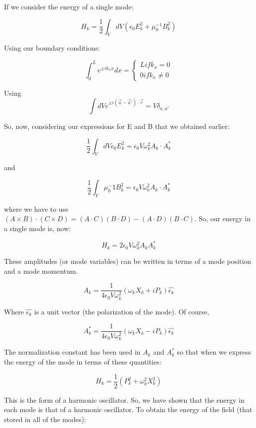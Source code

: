 \documentclass{article}
\begin{document}
If we consider the energy of a single mode:

\[ 
    H_k = \frac{1}{2}\int_{V} dV \left( \epsilon_0 E_k^2 + \mu_0^{-1} B_k^2 \right) 
\]

Using our boundary conditions:

\[ 
    \int_0^L e^{\pm i k_x x} dx  = 
    \begin{cases} 
        L if k_x = 0 \\ 
        0 if k_x \ne 0
    \end{cases}
\]

Using
\[ 
    \int dV e^{\pm i \left( \vec{a} - \vec{a}' \right)\cdot \vec{r}} = V
    \delta_{a,a'}
\]

So, now, considering our expressions for E and B that we obtained earlier:

\[
    \frac{1}{2}\int_V dV \epsilon_0 E_k^2 = \epsilon_0 V \omega_k^2 A_k \cdot
    A_k^*
\]

and 

\[ 
    \frac{1}{2} \int_V \mu_0^-1 B_k^2 = \epsilon_0 V \omega_k^2 A_k \cdot A_k^* 
\]

where we have to use $\left( A \times B \right)\cdot \left( C \times D \right) =
\left( A\cdot C \right)\left( B\cdot D \right) - \left( A \cdot D \right) \left( B
\cdot C\right)$. So, our energy in a single mode is, now:

\[ 
    H_k = 2 \epsilon_0 V \omega_k^2 A_k  A_k^* 
\]

These amplitudes (or mode variables) can be written in terms of a mode position
and a mode momentum.

\[ 
    A_k = \frac{1}{4\epsilon_0 V \omega_k^2} \left( \omega_k X_k + i P_k
    \right)\hat{\epsilon_k} 
\]

Where $\hat{\epsilon_k}$ is a unit vector (the polarization of the mode). Of
course,


\[ 
    A_k^* = \frac{1}{4\epsilon_0 V \omega_k^2} \left( \omega_k X_k - i P_k
    \right)\hat{\epsilon_k} 
\]

The normalization constant has been used in $A_k$ and $A_k^*$ so that when we
express the energy of the mode in terms of these quantities:

\[ 
    H_k = \frac{1}{2} \left( P_k^2 + \omega_k^2 X_k^2 \right) 
\]

This is the form of a harmonic oscillator. So, we have shown that the energy in
each mode is that of a harmonic oscillator. To obtain the energy of the field
(that stored in all of the modes):
\end{document}
